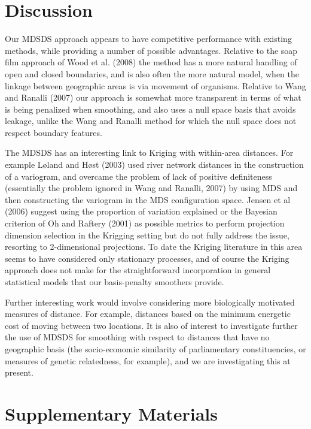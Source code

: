\documentclass[useAMS, referee]{biom}
\begin{document}
\section{Discussion}
\label{conclusion}

Our MDSDS approach appears to have competitive performance with existing methods, while providing a number of possible advantages. Relative to the soap film approach of Wood et al. (2008) the method has a more natural handling of open and closed boundaries, and is also often the more natural model, when the linkage between geographic areas is via movement of organisms. Relative to Wang and Ranalli (2007) our approach is somewhat more transparent in terms of what is being penalized when smoothing, and also uses a null space basis that avoids leakage, unlike the Wang and Ranalli method for which the null space does not respect boundary features. 

The MDSDS has an interesting link to Kriging with within-area distances. For example L{\o}land and H{\o}st (2003) used river network distances in the construction of a variogram, and overcame the problem of lack of positive definiteness (essentially the problem ignored in Wang and Ranalli, 2007) by using MDS and then constructing the variogram in the MDS configuration space. Jensen et al (2006) suggest using the proportion of variation explained or the Bayesian criterion of Oh and Raftery (2001) as possible metrics to perform projection dimension selection in the Krigging setting but do not fully address the issue, resorting to 2-dimensional projections. To date the Kriging literature in this area seems to have considered only stationary processes, and of course the Kriging approach does not make for the straightforward incorporation in general statistical models that our basis-penalty smoothers provide. 

Further interesting work would involve considering more biologically motivated measures of distance. For example, distances based on the minimum energetic cost of moving between  two locations. It is also of interest to investigate further the use of MDSDS for smoothing with respect to distances that have no geographic basis (the socio-economic similarity of parliamentary constituencies, or measures of genetic relatedness, for example), and we are investigating this at present.

\section*{Supplementary Materials}
\end{document}
